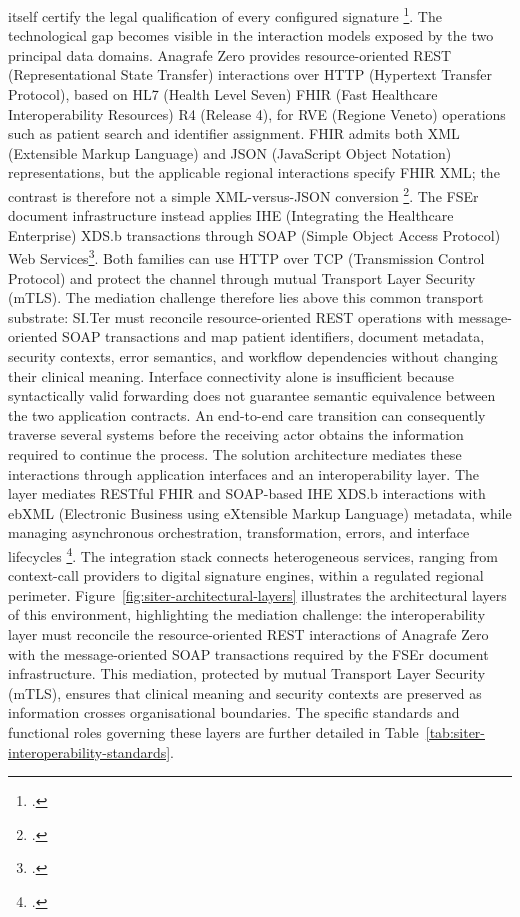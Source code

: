 itself certify the legal qualification of every configured signature
\footcites[pp.~7, 10, 28, and~89]{scryba-sign-developer-guide-v16}
[Articles~3 and~25]{eu-eidas-910-2014}
[Section~2]{rfc5544-timestamped-data}.
The technological gap becomes visible in the interaction models exposed by the
two principal data domains. Anagrafe Zero provides resource-oriented REST
(Representational State Transfer) interactions over HTTP (Hypertext Transfer
Protocol), based on HL7 (Health Level Seven) FHIR (Fast Healthcare
Interoperability Resources) R4 (Release 4), for RVE (Regione
Veneto) operations such as patient search and identifier assignment. FHIR
admits both XML (Extensible Markup Language) and
JSON (JavaScript Object Notation) representations, but the applicable regional
interactions specify FHIR XML; the contrast is therefore not a simple
XML-versus-JSON conversion \footcite[Sections~1.5.2 and~2.5.2]{arsenal-anagrafe-zero-v26}.
The FSEr document infrastructure instead applies IHE (Integrating the Healthcare
Enterprise) XDS.b transactions through SOAP (Simple Object Access Protocol)
Web Services\footcite{ihe-xdsb,affinity-domain-italia-v263}. Both families can use HTTP over TCP (Transmission Control Protocol) and protect the
channel through mutual Transport Layer Security (mTLS). The mediation challenge
therefore lies above this common transport substrate: SI.Ter must reconcile
resource-oriented REST operations with message-oriented SOAP transactions and
map patient identifiers, document metadata, security contexts, error semantics,
and workflow dependencies without changing their clinical meaning. Interface
connectivity alone is insufficient because syntactically valid forwarding does
not guarantee semantic equivalence between the two application contracts. An end-to-end care transition can consequently traverse several systems before
the receiving actor obtains the information required to continue the process.
The solution architecture mediates these interactions through application
interfaces and an interoperability layer. The layer mediates RESTful FHIR and
SOAP-based IHE XDS.b interactions with ebXML (Electronic Business using
eXtensible Markup Language) metadata, while managing asynchronous orchestration,
transformation, errors, and interface lifecycles
\footcite[Sections~2.1.2 and~2.1.4]{rti-siter-relazione-tecnica}.
\noindent The integration stack connects heterogeneous services, ranging from
context-call providers to digital signature engines, within a regulated regional
perimeter. Figure~\ref{fig:siter-architectural-layers} illustrates the
architectural layers of this environment, highlighting the mediation challenge:
the interoperability layer must reconcile the resource-oriented REST interactions
of Anagrafe Zero with the message-oriented SOAP transactions required by the FSEr
document infrastructure. This mediation, protected by mutual Transport Layer
Security (mTLS), ensures that clinical meaning and security contexts are preserved
as information crosses organisational boundaries. The specific standards and
functional roles governing these layers are further detailed in
Table~\ref{tab:siter-interoperability-standards}.

